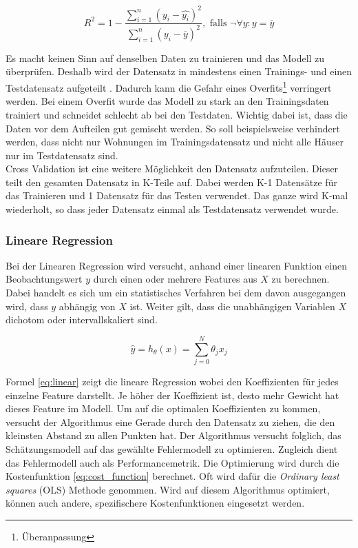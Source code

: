 \begin{equation}\label{eq:r2}
R^2 = 1 - \frac{\sum_{i=1}^{n} (y_i - \hat{y_i})^2}{\sum_{i=1}^{n}(y_i - \overline{y})^2},\text{ falls } \neg \forall y:y = \overline{y}
\end{equation}

Es macht keinen Sinn auf denselben Daten zu trainieren und das Modell zu überprüfen. Deshalb wird der Datensatz in mindestens einen Trainings- und einen Testdatensatz aufgeteilt \cite{cross_validation}.
Dadurch kann die Gefahr eines Overfits\footnote{Überanpassung} verringert werden. Bei einem Overfit wurde das Modell zu stark an den Trainingsdaten trainiert und schneidet schlecht ab bei den Testdaten. Wichtig dabei ist, dass die Daten vor dem Aufteilen gut gemischt werden. So soll beispielsweise verhindert werden, dass nicht nur Wohnungen im Trainingsdatensatz und nicht alle Häuser nur im Testdatensatz sind.\\
Cross Validation ist eine weitere Möglichkeit den Datensatz aufzuteilen. Dieser teilt den gesamten Datensatz in K-Teile auf. Dabei werden K-1 Datensätze für das Trainieren und 1 Datensatz für das Testen verwendet. Das ganze wird K-mal wiederholt, so dass jeder Datensatz einmal als Testdatensatz verwendet wurde.
%
\subsubsection{Lineare Regression}
Bei der Linearen Regression wird versucht, anhand einer linearen Funktion einen Beobachtungswert $y$ durch einen oder mehrere Features aus $X$ zu berechnen. Dabei handelt es sich um ein statistisches Verfahren bei dem davon ausgegangen wird, dass $y$ abhängig von $X$ ist. Weiter gilt, dass die unabhängigen Variablen $X$ dichotom oder intervallskaliert sind.

\begin{equation}\label{eq:linear}
\hat{y} = h_\theta(x) = \sum_{j=0}^{N} \theta_j x_j
\end{equation}

Formel \eqref{eq:linear} zeigt die lineare Regression wobei  den Koeffizienten für jedes einzelne Feature darstellt. Je höher der Koeffizient ist, desto mehr Gewicht hat dieses Feature im Modell. Um auf die optimalen Koeffizienten zu kommen, versucht der Algorithmus eine Gerade durch den Datensatz zu ziehen, die den kleinsten Abstand zu allen Punkten hat. Der Algorithmus versucht folglich, das Schätzungsmodell auf das gewählte Fehlermodell zu optimieren. Zugleich dient das Fehlermodell auch als Performancemetrik. Die Optimierung wird durch die Kostenfunktion \eqref{eq:cost_function} berechnet. Oft wird dafür die \textit{Ordinary least squares} (OLS) Methode genommen. Wird auf diesem Algorithmus optimiert, können auch andere, spezifischere Kostenfunktionen eingesetzt werden.

